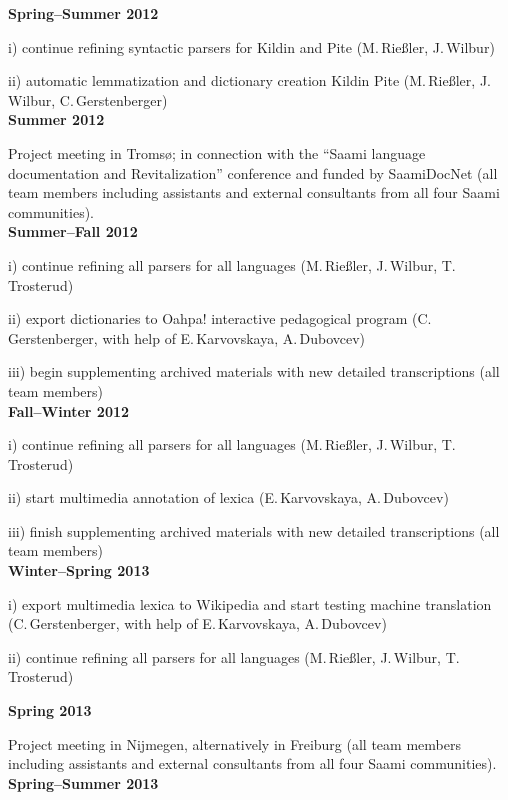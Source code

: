 \documentclass[a4paper,12pt]{article}
\begin{document}
{{\noindent \textbf{Spring–Summer 2012}

i) continue refining syntactic parsers for Kildin and Pite (M.\,Rießler, J.\,Wilbur)

ii) automatic lemmatization and dictionary creation Kildin Pite (M.\,Rießler, J.\,Wilbur, C.\,Gerstenberger)\\

\noindent \textbf{Summer 2012} 

Project meeting in Tromsø; in connection with the “Saami language documentation and Revitalization” conference and funded by SaamiDocNet (all team members including assistants and external consultants from all four Saami communities).\\

\noindent \textbf{Summer–Fall 2012}

i) continue refining all parsers for all languages (M.\,Rießler, J.\,Wilbur, T.\,Trosterud)

ii) export dictionaries to Oahpa! interactive pedagogical program (C.\,Gerstenberger, with help of E.\,Karvovskaya, A.\,Dubovcev)

iii) begin supplementing archived materials with new detailed transcriptions (all team members)\\

\noindent \textbf{Fall–Winter 2012}

i) continue refining all parsers for all languages (M.\,Rießler, J.\,Wilbur, T.\,Trosterud)

ii) start multimedia annotation of lexica (E.\,Karvovskaya, A.\,Dubovcev)

iii) finish supplementing archived materials with new detailed transcriptions (all team members)\\

\noindent \textbf{Winter–Spring 2013}

i) export multimedia lexica to Wikipedia and start testing machine translation (C.\,Gerstenberger, with help of E.\,Karvovskaya, A.\,Dubovcev)

ii) continue refining all parsers for all languages (M.\,Rießler, J.\,Wilbur, T.\,Trosterud)

\noindent \textbf{Spring 2013} 

Project meeting in Nijmegen, alternatively in Freiburg (all team members including assistants and external consultants from all four Saami communities).\\

\noindent \textbf{Spring–Summer 2013} 

}}
\end{document}
